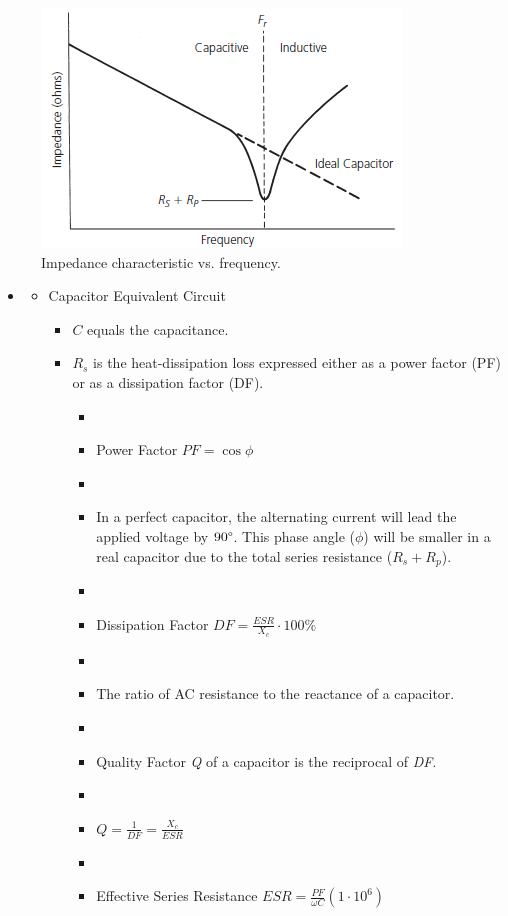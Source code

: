 \begin{figure} [H]
	\centering
	\includegraphics[width=0.65\linewidth]{graphics/16.png}
	\caption{Impedance characteristic vs. frequency.}
	\label{fig:16}
\end{figure}

\begin{itemize}
	\item[] 
	\begin{itemize}
		\item Capacitor Equivalent Circuit
		\begin{itemize}
			\item $C$ equals the capacitance.
			\item $R_s$ is the heat-dissipation loss expressed either as a power factor (PF) or as a dissipation factor (DF).
			\begin{itemize}
				\item[]
				\item[] Power Factor $PF = \cos\phi$ 
				\item[]
				\item In a perfect capacitor, the alternating current	will lead the applied voltage by $90\degree$. This phase angle ($\phi$) will	be smaller in a real capacitor due to the total series resistance ($R_s +R_p$).
				\item[]
				\item[] Dissipation Factor $DF = \frac{ESR}{X_c}\cdot 100\%$
				\item[]
				\item The ratio of AC resistance to the	reactance of a capacitor.
				\item[]
				\item Quality Factor \textit{Q} of a capacitor is the reciprocal of \textit{DF}.
				\item[]
				\item[] $Q = \frac{1}{DF}=\frac{X_c}{ESR}$
				\item[]
				\item[] Effective Series Resistance $ESR = \frac{PF}{\omega C}(1\cdot 10^6)$

\end{itemize}
\end{itemize}
\end{itemize}
\end{itemize}
